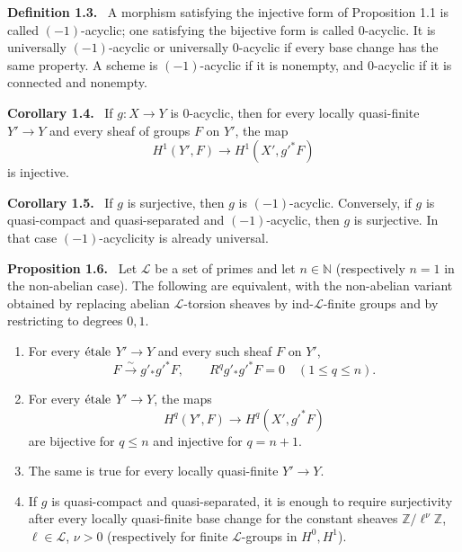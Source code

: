 \documentclass[12pt]{article}
\newcommand{\Zz}{\mathbb{Z}}
\newcommand{\LL}{\mathcal L}
\newcommand{\etale}{\ifmmode\textnormal{\'etale}\else\'etale\fi}
\newenvironment{statement}[1]{\par\medskip\noindent\textbf{#1.}\ }{\par\medskip}
\begin{document}
\begin{statement}{Definition 1.3}
A morphism satisfying the injective form of Proposition 1.1 is called \((-1)\)-acyclic; one satisfying the bijective form is called \(0\)-acyclic. It is universally \((-1)\)-acyclic or universally \(0\)-acyclic if every base change has the same property. A scheme is \((-1)\)-acyclic if it is nonempty, and \(0\)-acyclic if it is connected and nonempty.
\end{statement}

\begin{statement}{Corollary 1.4}
If \(g:X\to Y\) is \(0\)-acyclic, then for every locally quasi-finite \(Y'\to Y\) and every sheaf of groups \(F\) on \(Y'\), the map
\[
H^1(Y',F)\longrightarrow H^1(X',g'^*F)
\]
is injective.
\end{statement}

\begin{statement}{Corollary 1.5}
If \(g\) is surjective, then \(g\) is \((-1)\)-acyclic. Conversely, if \(g\) is quasi-compact and quasi-separated and \((-1)\)-acyclic, then \(g\) is surjective. In that case \((-1)\)-acyclicity is already universal.
\end{statement}

\begin{statement}{Proposition 1.6}
Let \(\LL\) be a set of primes and let \(n\in\mathbb N\) (respectively \(n=1\) in the non-abelian case). The following are equivalent, with the non-abelian variant obtained by replacing abelian \(\LL\)-torsion sheaves by ind-\(\LL\)-finite groups and by restricting to degrees \(0,1\).
\begin{enumerate}[label=(\roman*)]
\item For every \(\etale\) \(Y'\to Y\) and every such sheaf \(F\) on \(Y'\),
\[
F\xrightarrow{\sim} g'_*g'^*F,
\qquad
R^qg'_*g'^*F=0\quad(1\le q\le n).
\]
\item For every \(\etale\) \(Y'\to Y\), the maps
\[
H^q(Y',F)\to H^q(X',g'^*F)
\]
are bijective for \(q\le n\) and injective for \(q=n+1\).
\item The same is true for every locally quasi-finite \(Y'\to Y\).
\item If \(g\) is quasi-compact and quasi-separated, it is enough to require surjectivity after every locally quasi-finite base change for the constant sheaves \(\Zz/\ell^\nu\Zz\), \(\ell\in\LL\), \(\nu>0\) (respectively for finite \(\LL\)-groups in \(H^0,H^1\)).
\end{enumerate}
\end{statement}
\end{document}
